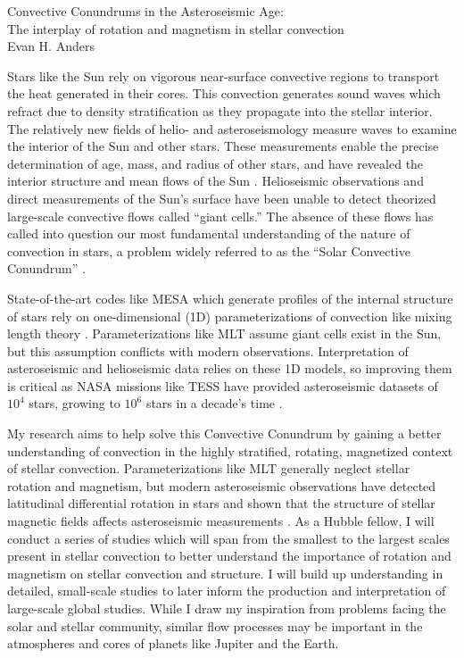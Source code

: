 \documentclass[11pt, preprint, hmargin=1in, vmargin=1in]{aastex62}
\begin{document}
\begin{center}
\Large{Convective Conundrums in the Asteroseismic Age:\\\vspace{-6pt}The interplay of rotation and magnetism in stellar convection} \\
\large{Evan H. Anders }
\end{center}
\vspace{-0.2cm}



Stars like the Sun rely on vigorous near-surface convective regions to transport the heat generated in their cores.
This convection generates sound waves which refract due to density stratification as they propagate into the stellar interior.
The relatively new fields of helio- and asteroseismology measure waves to examine the interior of the Sun and other stars.
These measurements enable the precise determination of age, mass, and radius of other stars, and have revealed the interior structure and mean flows of the Sun \citep{huber&all2019, christensen-dalsgaard2002}.
Helioseismic observations and direct measurements of the Sun's surface have been unable to detect theorized large-scale convective flows called ``giant cells.''
The absence of these flows has called into question our most fundamental understanding of the nature of convection in stars, a problem widely referred to as the ``Solar Convective Conundrum'' \citep{hanasoge&all2015}.

State-of-the-art codes like MESA \citep{paxton&all2011} which generate profiles of the internal structure of stars rely on one-dimensional (1D) parameterizations of convection like mixing length theory \citep[MLT,][]{bohm-vitense1958}.
Parameterizations like MLT assume giant cells exist in the Sun, but this assumption conflicts with modern observations.
Interpretation of asteroseismic and helioseismic data relies on these 1D models, so improving them is critical as NASA missions like TESS have provided asteroseismic datasets of $10^4$ stars, growing to $10^6$ stars in a decade's time \citep{huber&all2019}.

My research aims to  help solve this Convective Conundrum by gaining a better understanding of convection in the highly stratified, rotating, magnetized context of stellar convection.
Parameterizations like MLT generally neglect stellar rotation and magnetism, but modern asteroseismic observations have detected latitudinal differential rotation in stars \citep{benomar&all2018} and shown that the structure of stellar magnetic fields affects asteroseismic measurements \citep{santos&all2018}.
As a Hubble fellow, I will conduct a series of studies which will span from the smallest to the largest scales present in stellar convection to better understand the importance of rotation and magnetism on stellar convection and structure.
I will build up understanding in detailed, small-scale studies to later inform the production and interpretation of large-scale global studies.
While I draw my inspiration from problems facing the solar and stellar community, similar flow processes may be important in the atmospheres and cores of planets like Jupiter and the Earth. 
\end{document}
